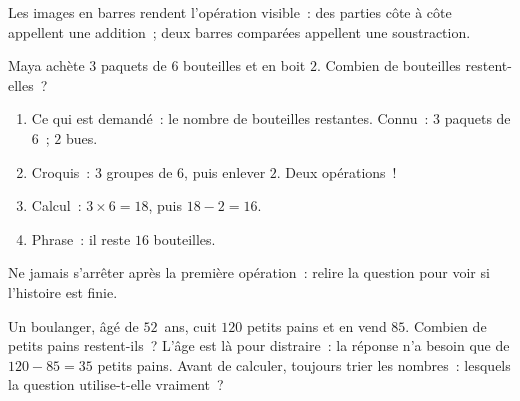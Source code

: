 \begin{omfigure}

{\small Les images en barres rendent l'opération visible~: des
parties côte à côte appellent une addition~; deux barres
comparées appellent une soustraction.}
\end{omfigure}

\begin{example}\label{ex:g3:problems:twostep}
\guillemotleft{} Maya achète $3$ paquets de $6$ bouteilles et en
boit $2$. Combien de bouteilles restent-elles~? \guillemotright{}
\begin{enumerate}
  \item Ce qui est demandé~: le nombre de bouteilles restantes.
        Connu~: $3$ paquets de $6$~; $2$ bues.
  \item Croquis~: $3$ groupes de $6$, puis enlever $2$. Deux
        opérations~!
  \item Calcul~: $3 \times 6 = 18$, puis $18 - 2 = 16$.
  \item Phrase~: il reste $16$ bouteilles.
\end{enumerate}
Ne jamais s'arrêter après la première opération~: relire la
question pour voir si l'histoire est finie.
\end{example}

\begin{example}\label{ex:g3:problems:trap}
\guillemotleft{} Un boulanger, âgé de $52$~ans, cuit $120$ petits
pains et en vend $85$. Combien de petits pains restent-ils~?
\guillemotright{} L'âge est là pour distraire~: la réponse n'a
besoin que de $120 - 85 = 35$ petits pains. Avant de calculer,
toujours trier les nombres~: lesquels la question utilise-t-elle
vraiment~?
\end{example}

